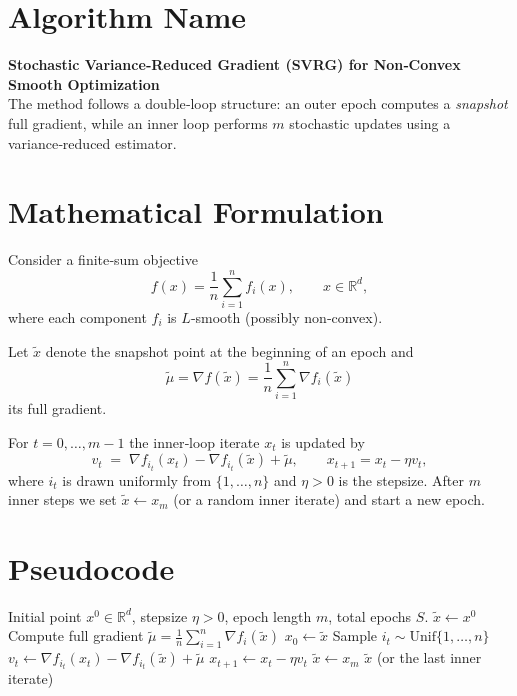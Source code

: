 \documentclass{article}
\newcommand{\R}{\mathbb{R}}
\begin{document}
\section*{Algorithm Name}
\textbf{Stochastic Variance‑Reduced Gradient (SVRG) for Non‑Convex Smooth Optimization}\\
The method follows a double‑loop structure: an outer epoch computes a \emph{snapshot} full gradient, while an inner loop performs $m$ stochastic updates using a variance‑reduced estimator.

\section*{Mathematical Formulation}
Consider a finite‑sum objective
\[
f(x)=\frac1n\sum_{i=1}^{n} f_i(x),\qquad x\in\R^{d},
\]
where each component $f_i$ is $L$‑smooth (possibly non‑convex).  

Let $\tilde{x}$ denote the snapshot point at the beginning of an epoch and
\[
\tilde{\mu}= \nabla f(\tilde{x})=\frac1n\sum_{i=1}^{n}\nabla f_i(\tilde{x})
\]
its full gradient.  

For $t=0,\dots,m-1$ the inner‑loop iterate $x_t$ is updated by
\[
\boxed{v_t \;=\; \nabla f_{i_t}(x_t)-\nabla f_{i_t}(\tilde{x})+\tilde{\mu}},\qquad
x_{t+1}=x_t-\eta v_t,
\]
where $i_t$ is drawn uniformly from $\{1,\dots,n\}$ and $\eta>0$ is the stepsize.  
After $m$ inner steps we set $\tilde{x}\leftarrow x_m$ (or a random inner iterate) and start a new epoch.

\section*{Pseudocode}
\begin{algorithm}[H]
\caption{SVRG (non‑convex, $L$‑smooth)}\label{alg:svrg}
\begin{algorithmic}[1]
\Require Initial point $x^{0}\in\R^{d}$, stepsize $\eta>0$, epoch length $m$, total epochs $S$.
\State $\tilde{x}\gets x^{0}$
    \State Compute full gradient $\tilde{\mu}= \frac1n\sum_{i=1}^{n}\nabla f_i(\tilde{x})$
    \State $x_0\gets \tilde{x}$
        \State Sample $i_t\sim\text{Unif}\{1,\dots,n\}$
        \State $v_t \gets \nabla f_{i_t}(x_t)-\nabla f_{i_t}(\tilde{x})+\tilde{\mu}$
        \State $x_{t+1}\gets x_t-\eta v_t$
    \EndFor
    \State $\tilde{x}\gets x_m$ 
\EndFor
\State \Return $\tilde{x}$ (or the last inner iterate)
\end{algorithmic}
\end{algorithm}
\end{document}
